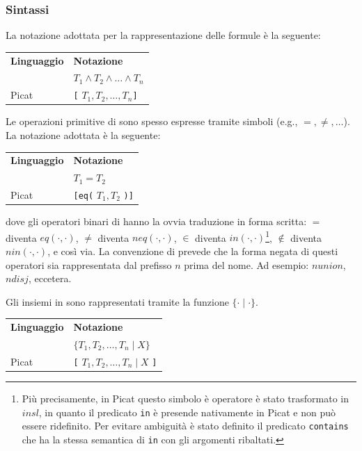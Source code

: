 \documentclass[12pt,a4paper,openright]{book}  %
\begin{document}
\subsubsection{Sintassi}

La notazione adottata per la rappresentazione delle formule è la
seguente:

\begin{table}[H]
	\center
	\begin{tabular}{ll}
		\textbf{Linguaggio} & \textbf{Notazione} \\
		\lset{} & $T_1 \land T_2 \land \ldots \land T_n$ \\
		Picat & \verb|[| $T_1, T_2, \ldots, T_n$\verb|]| \\
	\end{tabular}
\end{table}

Le operazioni primitive di \clpset{} sono spesso espresse tramite
simboli (e.g., $=, \neq, \ldots$). La notazione adottata è la
seguente:
\begin{table}[H]
	\center
	\begin{tabular}{l l}
		\textbf{Linguaggio} & \textbf{Notazione} \\
		\lset{} & $T_1 = T_2$ \\
		Picat & \verb|[eq(| $T_1, T_2$ \verb|)]| \\
	\end{tabular}
\end{table}
dove gli operatori binari di \lset{} hanno la ovvia traduzione in
forma scritta: $=$ diventa $eq(\cdot, \cdot)$, $\neq$ diventa
$neq(\cdot, \cdot)$, $\in$ diventa $in(\cdot, \cdot)$\footnote{Più
  precisamente, in Picat questo simbolo è operatore è stato
  trasformato in $insl$, in quanto il predicato \texttt{in} è presende
  nativamente in Picat e non può essere ridefinito. Per evitare
  ambiguità è stato definito il predicato \texttt{contains} che ha la
  stessa semantica di \texttt{in} con gli argomenti ribaltati.},
$\not\in$ diventa $nin(\cdot, \cdot)$, e così via. La convenzione di
\lset{} prevede che la forma negata di questi operatori sia
rappresentata dal prefisso $n$ prima del nome. Ad esempio: $nunion$,
$ndisj$, eccetera.

Gli insiemi in \clpset{} sono rappresentati tramite la funzione $\{
\cdot \mid \cdot \}$.

\begin{table}[H]
	\center
	\begin{tabular}{l l}
		\textbf{Linguaggio} & \textbf{Notazione} \\
		\lset{} & $\{ T_1, T_2, \ldots, T_n \mid X \}$ \\
		Picat & \verb|[| $T_1, T_2, \ldots, T_n \mid X$ \verb|]| \\
	\end{tabular}
\end{table}
\end{document}
